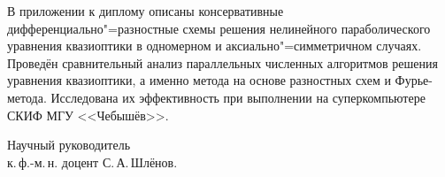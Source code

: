 \documentclass[12pt,a4paper]{article}
\begin{document}
В приложении к диплому описаны консервативные дифференциально"=разностные схемы решения нелинейного параболического уравнения квазиоптики
в одномерном и аксиально"=симметричном случаях. Проведён сравнительный анализ
параллельных численных алгоритмов решения уравнения квазиоптики, а именно метода на основе разностных схем и Фурье-метода.
Исследована их эффективность при выполнении на суперкомпьютере СКИФ МГУ <<Чебышёв>>.

\vspace{4ex}

Научный руководитель \\
к.\,ф.-м.\,н. \hfill доцент С.\,А.\,Шлёнов.
\end{document}
